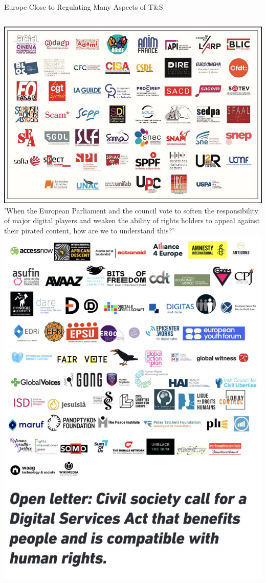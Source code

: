 \documentclass[nobackground,dvipsnames,table,aspectratio=169]{beamer}
\begin{document}
\begin{frame}{Europe Close to Regulating Many Aspects of T\&S}
    \begin{columns}
            \includegraphics[width=\textwidth]{europe-tns-regulation}
            \small
            'When the European Parliament and the council vote to soften the responsibility of major digital players and weaken the ability of rights holders to appeal against their pirated content, how are we to understand this?'
            \includegraphics[width=\textwidth]{europe-tns-regulation-open-letter}
    \end{columns}
\end{frame}
\end{document}
